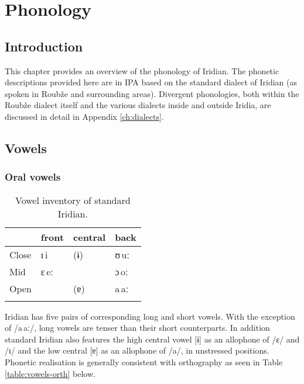 \chapter{Phonology}\label{ch:phon}

\section{Introduction}

This chapter provides an overview of the phonology of Iridian. The phonetic descriptions provided here are in IPA based on the standard dialect of Iridian (as spoken in Roubže and surrounding areas). Divergent phonologies, both within the Roub\v{z}e dialect itself and the various dialects inside and outside Iridia, are discussed in detail in Appendix \ref{ch:dialects}.

\section{Vowels}\label{sec:vowels}

\subsection{Oral vowels}

\begin{table}[ht!]
	\footnotesize\sffamily
	\caption{Vowel inventory of standard Iridian.}
	\medskip
	\begin{tabularx}{0.7\textwidth}{@{}YMMM@{}}
		\toprule
					& {\sc front}		& {\sc central}			& {\sc back}	\\\midrule
		Close 		& ɪ\,i 				& (ɨ)					& ʊ\,uː			\\
		Mid 		& ɛ\,eː 			& 						& ɔ\,oː			\\
		Open 		& 					&(ɐ)					& a\,aː 		\\
		\bottomrule
		\label{table:vowels}{}
	\end{tabularx}
\end{table}{}

Iridian has five pairs of corresponding long and short vowels. With the exception of /a\,aː/, long vowels are tenser than their short counterparts. In addition standard Iridian also features the high central vowel [ɨ] as an allophone of /ɛ/ and /ɪ/ and the low central [ɐ] as an allophone of /a/, in unstressed positions. Phonetic realisation is generally consistent with orthography as seen in Table \ref{table:vowels-orth} below.

